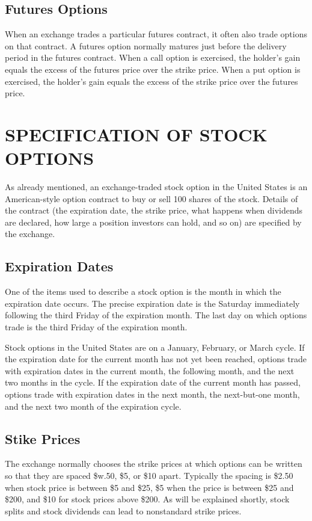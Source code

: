 \documentclass{article}
\begin{document}
\subsection{Futures Options}
When an exchange trades a particular futures contract, it often also trade options on that contract. A futures option normally matures just before the delivery period in the futures contract. When a call option is exercised, the holder's gain equals the excess of the futures price over the strike price. When a put option is exercised, the holder's gain equals the excess of the strike price over the futures price.

\section{SPECIFICATION OF STOCK OPTIONS}
As already mentioned, an exchange-traded stock option in the United States is an American-style option contract to buy or sell 100 shares of the stock. Details of the contract (the expiration date, the strike price, what happens when dividends are declared, how large a position investors can hold, and so on) are specified by the exchange.

\subsection{Expiration Dates}
One of the items used to describe a stock option is the month in which the expiration date occurs. The precise expiration date is the Saturday immediately following the third Friday of the expiration month. The last day on which options trade is the third Friday of the expiration month. 

Stock options in the United States are on a January, February, or March cycle. If the  expiration date for the current month has not yet been reached, options trade with expiration dates in the current month, the following month, and the next two months in the cycle. If the expiration date of the current month has passed, options trade with expiration dates in the next month, the next-but-one month, and the next two month of the expiration cycle.

\subsection{Stike Prices}
The exchange normally chooses the strike prices at which options can be written so that they are spaced \$w.50, \$5, or \$10 apart. Typically the spacing is \$2.50 when stock price is between \$5 and \$25, \$5 when the price is between \$25 and \$200, and \$10 for stock prices above \$200. As will be explained shortly, stock splits and stock dividends can lead to nonstandard strike prices.
\end{document}
